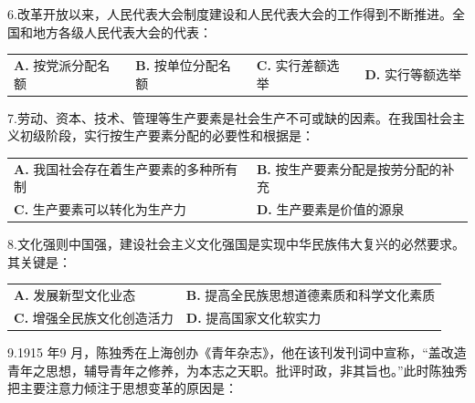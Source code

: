 \documentclass[UTF8,11pt]{ctexart}
\begin{document}
6.改革开放以来，人民代表大会制度建设和人民代表大会的工作得到不断推进。全国和地方各级人民代表大会的代表：


\begin{center}\begin{tabular}{>{\raggedright\arraybackslash}p{\dimexpr(\linewidth-8\tabcolsep)/4\relax}>{\raggedright\arraybackslash}p{\dimexpr(\linewidth-8\tabcolsep)/4\relax}>{\raggedright\arraybackslash}p{\dimexpr(\linewidth-8\tabcolsep)/4\relax}>{\raggedright\arraybackslash}p{\dimexpr(\linewidth-8\tabcolsep)/4\relax}}
\textbf{A.} 按党派分配名额 & \textbf{B.} 按单位分配名额 & \textbf{C.} 实行差额选举 & \textbf{D.} 实行等额选举\\[.35em]\end{tabular}\end{center}

7.劳动、资本、技术、管理等生产要素是社会生产不可或缺的因素。在我国社会主义初级阶段，实行按生产要素分配的必要性和根据是：


\begin{center}\begin{tabular}{>{\raggedright\arraybackslash}p{\dimexpr(\linewidth-4\tabcolsep)/2\relax}>{\raggedright\arraybackslash}p{\dimexpr(\linewidth-4\tabcolsep)/2\relax}}
\textbf{A.} 我国社会存在着生产要素的多种所有制 & \textbf{B.} 按生产要素分配是按劳分配的补充\\[.35em]
\textbf{C.} 生产要素可以转化为生产力 & \textbf{D.} 生产要素是价值的源泉\\[.35em]\end{tabular}\end{center}

8.文化强则中国强，建设社会主义文化强国是实现中华民族伟大复兴的必然要求。其关键是：


\begin{center}\begin{tabular}{>{\raggedright\arraybackslash}p{\dimexpr(\linewidth-4\tabcolsep)/2\relax}>{\raggedright\arraybackslash}p{\dimexpr(\linewidth-4\tabcolsep)/2\relax}}
\textbf{A.} 发展新型文化业态 & \textbf{B.} 提高全民族思想道德素质和科学文化素质\\[.35em]
\textbf{C.} 增强全民族文化创造活力 & \textbf{D.} 提高国家文化软实力\\[.35em]\end{tabular}\end{center}

9.1915 年9 月，陈独秀在上海创办《青年杂志》，他在该刊发刊词中宣称，“盖改造青年之思想，辅导青年之修养，为本志之天职。批评时政，非其旨也。”此时陈独秀把主要注意力倾注于思想变革的原因是：
\end{document}
